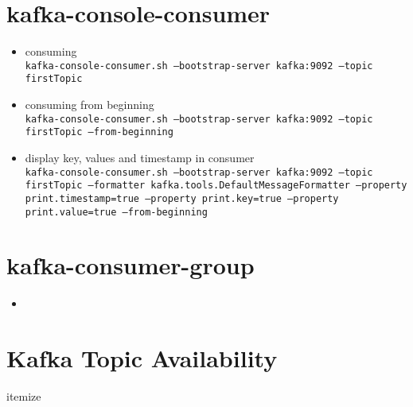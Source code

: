 \documentclass{article}
\begin{document}
\section{kafka-console-consumer}
\begin{itemize}
\item consuming\\
\texttt{kafka-console-consumer.sh --bootstrap-server kafka:9092 --topic firstTopic}
\item consuming from beginning\\
\texttt{kafka-console-consumer.sh --bootstrap-server kafka:9092 --topic firstTopic --from-beginning}
\item display key, values and timestamp in consumer\\
\texttt{kafka-console-consumer.sh --bootstrap-server kafka:9092 --topic firstTopic --formatter kafka.tools.DefaultMessageFormatter --property print.timestamp=true --property print.key=true --property print.value=true --from-beginning}
\end{itemize}

\section{kafka-consumer-group}
\begin{itemize}
\item
\end{itemize}

\section{Kafka Topic Availability}
itemize
\end{document}
